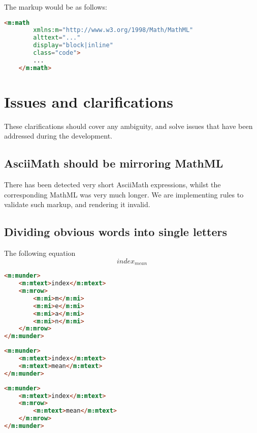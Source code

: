 \documentclass[english,a4paper,11pt]{article}
\begin{document}
\begin{examples}
The markup would be as follows:
\begin{lstlisting}[language=HTML]
	<m:math 
	    xmlns:m="http://www.w3.org/1998/Math/MathML"
	    alttext="..."
	    display="block|inline"
		class="code">
		...
	</m:math>
\end{lstlisting}
\end{examples}

\section{Issues and clarifications}

These clarifications should cover any ambiguity, and solve issues that have been addressed during the development.

\subsection{AsciiMath should be mirroring MathML}

There has been detected very short AsciiMath expressions, whilst the corresponding MathML was very much longer. We are implementing rules to validate such markup, and rendering it invalid.

\subsection{Dividing obvious words into single letters}
\begin{examples}
	The following equation
\begin{equation}
	index_{mean}
\end{equation}

\begin{lstlisting}[language=HTML, caption={\textbf{Invalid markup}}]
<m:munder>
	<m:mtext>index</m:mtext>
	<m:mrow>
		<m:mi>m</m:mi>
		<m:mi>e</m:mi>
		<m:mi>a</m:mi>
		<m:mi>n</m:mi>
	</m:mrow>
</m:munder>
\end{lstlisting}

\begin{lstlisting}[language=HTML, caption={Valid markup 1}]
<m:munder>
	<m:mtext>index</m:mtext>
	<m:mtext>mean</m:mtext>
</m:munder>
\end{lstlisting}

\begin{lstlisting}[language=HTML, caption={Valid markup 2}]
<m:munder>
	<m:mtext>index</m:mtext>
	<m:mrow>
		<m:mtext>mean</m:mtext>
	</m:mrow>
</m:munder>
\end{lstlisting}
\end{examples}
\end{document}
